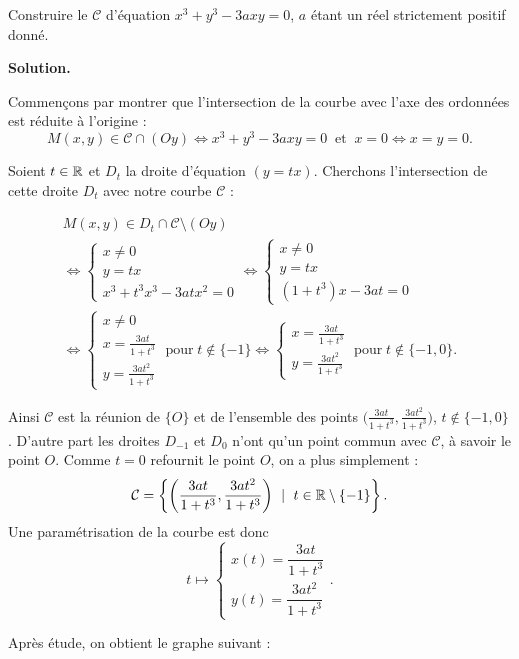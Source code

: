 \documentclass[class=report,crop=false]{standalone}
\begin{document}
\begin{exemple}
Construire le  $\mathcal{C}$
d'équation $x^3+y^3-3axy=0$, $a$ étant un réel strictement positif donné.

\medskip
\textbf{Solution.}

Commençons par montrer que l'intersection de la courbe avec
l'axe des ordonnées est réduite à l'origine :
$$M(x,y)\in\mathcal{C}\cap(Oy) \iff x^3+y^3-3axy=0
\ \text{ et }\ x=0 \iff x=y=0.$$


Soient $t\in\mathbb{R}$ et $D_t$ la droite d'équation $(y=tx)$.
Cherchons l'intersection de cette droite $D_t$ avec notre courbe $\mathcal{C}$ :

$$\begin{array}{l}
M(x,y)\in D_t\cap\mathcal{C}\setminus(Oy) \\
\iff\left\{
\begin{array}{l}
x\neq0\\
y=tx\\
x^3+t^3x^3-3atx^2=0
\end{array}
\right.
\iff\left\{
\begin{array}{l}
x\neq0\\
y=tx\\
(1+t^3)x-3at=0
\end{array}
\right.\\
\iff\left\{
\begin{array}{l}
x\neq0\\
x=\frac{3at}{1+t^3}\\
y=\frac{3at^2}{1+t^3}
\end{array}
\right.\;\text{pour}\;t\notin\{-1\}\iff\left\{
\begin{array}{l}
x=\frac{3at}{1+t^3}\\
y=\frac{3at^2}{1+t^3}
\end{array}
\right.\;\text{pour}\;t\notin\{-1,0\}.
\end{array}$$



Ainsi $\mathcal{C}$ est la réunion
de $\{O\}$ et de l'ensemble des points $\big(\frac{3at}{1+t^3},\frac{3at^2}{1+t^3}\big)$,
$t\notin\{-1,0\}$.
D'autre part les droites $D_{-1}$ et $D_0$ n'ont qu'un point commun avec $\mathcal{C}$,
à savoir le point $O$.
Comme $t=0$ refournit le point $O$, on a plus simplement :
$$\mathcal{C}=\left\{\left(\frac{3at}{1+t^3},\frac{3at^2}{1+t^3}\right)\ \mid \ t\in\Rr\setminus\{-1\}\right\}.$$
Une paramétrisation de la courbe est donc
$$t\mapsto\left\{
\begin{array}{l}
x(t)=\dfrac{3at}{1+t^3}\\
y(t)=\dfrac{3at^2}{1+t^3}
\end{array}
\right..$$

Après étude, on obtient le graphe suivant :

\end{exemple}
\end{document}
